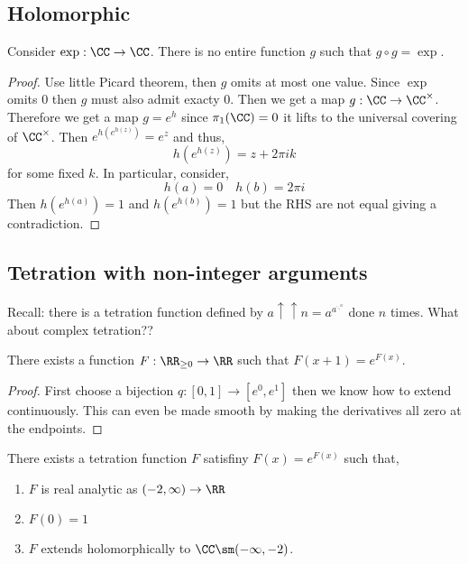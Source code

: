\documentclass[12pt]{article}
\begin{document}
\subsection{Holomorphic}

\begin{prop}
Consider $\exp : \CC \to \CC$. There is no entire function $g$ such that $g \circ g = \exp$. 
\end{prop}

\begin{proof}
Use little Picard theorem, then $g$ omits at most one value. Since $\exp$ omits $0$ then $g$ must also admit exacty $0$. Then we get a map $g : \CC \to \CC^\times$. Therefore we get a map $g = e^h$ since $\pi_1(\CC) = 0$ it lifts to the universal covering of $\CC^\times$. Then $e^{h(e^{h(z)})} = e^z$ and thus,
\[ h(e^{h(z)}) = z + 2 \pi i k \]
for some fixed $k$. In particular, consider,
\[ h(a) = 0 \quad h(b) = 2 \pi i \]
Then $h(e^{h(a)}) = 1$ and $h(e^{h(b)}) = 1$ but the RHS are not equal giving a contradiction.
\end{proof}

\subsection{Tetration with non-integer arguments}

Recall: there is a tetration function defined by $a \uparrow \uparrow n = a^{a^{\ddots^{a}}}$ done $n$ times. What about complex tetration?? 

\begin{prop}
There exists a function $F : \RR_{\ge 0} \to \RR$ such that $F(x+1) = e^{F(x)}$. 
\end{prop}

\begin{proof}
First choose a bijection $q : [0,1] \to [e^0, e^1]$ then we know how to extend continuously. This can even be made smooth by making the derivatives all zero at the endpoints.
\end{proof}

\begin{theorem}[Kneser, 1950]
There exists a tetration function $F$ satisfiny $F(x) = e^{F(x)}$ such that,
\begin{enumerate}
\item $F$ is real analytic as $(-2, \infty) \to \RR$
\item $F(0) = 1$
\item $F$ extends holomorphically to $\CC \sm (-\infty, -2)$.
\end{enumerate}
\end{theorem}
\end{document}
